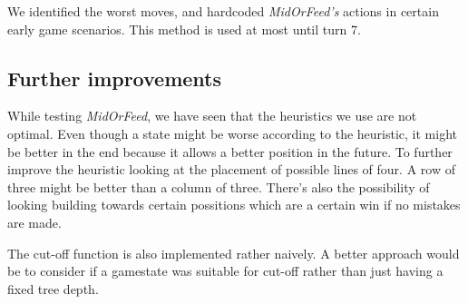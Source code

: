 We identified the worst moves, and hardcoded \textit{MidOrFeed's} actions in certain early game scenarios. This method is used at most until turn 7.

\subsection{Further improvements}
While testing \textit{MidOrFeed}, we have seen that the heuristics we use are not optimal. Even though a state might be worse according to the heuristic, it might be better in the end because it allows a better position in the future. To further improve the heuristic looking at the placement of possible lines of four. A row of three might be better than a column of three. There's also the possibility of looking building towards certain possitions which are a certain win if no mistakes are made.

The cut-off function is also implemented rather naively. A better approach would be to consider if a gamestate was suitable for cut-off rather than just having a fixed tree depth.